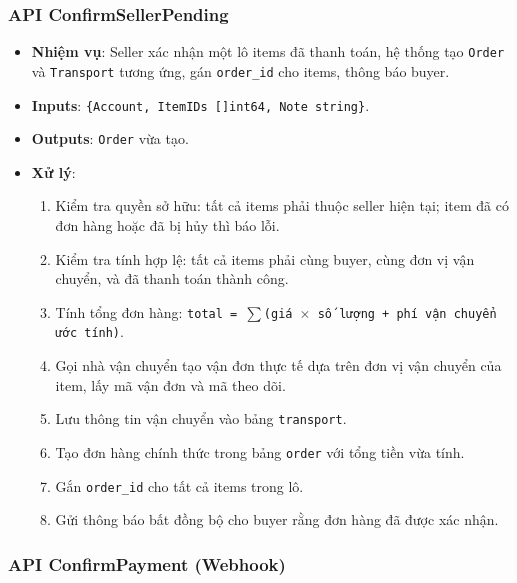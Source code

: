 \subsubsection{API ConfirmSellerPending}

\begin{itemize}[leftmargin=*]
  \item \textbf{Nhiệm vụ}: Seller xác nhận một lô items đã thanh toán, hệ thống tạo \texttt{Order} và \texttt{Transport} tương ứng, gán \texttt{order\_id} cho items, thông báo buyer.
  \item \textbf{Inputs}: \texttt{\{Account, ItemIDs []int64, Note string\}}.
  \item \textbf{Outputs}: \texttt{Order} vừa tạo.
  \item \textbf{Xử lý}:
    \begin{enumerate}
      \item Kiểm tra quyền sở hữu: tất cả items phải thuộc seller hiện tại; item đã có đơn hàng hoặc đã bị hủy thì báo lỗi.
      \item Kiểm tra tính hợp lệ: tất cả items phải cùng buyer, cùng đơn vị vận chuyển, và đã thanh toán thành công.
      \item Tính tổng đơn hàng: \texttt{total = $\sum$(giá $\times$ số lượng + phí vận chuyển ước tính)}.
      \item Gọi nhà vận chuyển tạo vận đơn thực tế dựa trên đơn vị vận chuyển của item, lấy mã vận đơn và mã theo dõi.
      \item Lưu thông tin vận chuyển vào bảng \texttt{transport}.
      \item Tạo đơn hàng chính thức trong bảng \texttt{order} với tổng tiền vừa tính.
      \item Gắn \texttt{order\_id} cho tất cả items trong lô.
      \item Gửi thông báo bất đồng bộ cho buyer rằng đơn hàng đã được xác nhận.
    \end{enumerate}
\end{itemize}

\subsubsection{API ConfirmPayment (Webhook)}


